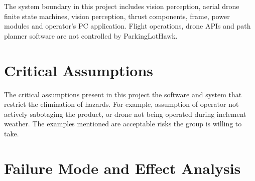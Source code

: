 \documentclass{article}
\begin{document}
The system boundary in this project includes vision perception, aerial drone finite state machines, vision perception, thrust components, frame, power modules and operator’s PC application. Flight operations, drone APIs and path planner software are not controlled by ParkingLotHawk.




\section{Critical Assumptions}
The critical assumptions present in this project the software and system that restrict the elimination of hazards. For example, assumption of operator not actively sabotaging the product, or drone not being operated during inclement weather. The examples mentioned are acceptable risks the group is willing to take. 



\section{Failure Mode and Effect Analysis}
\end{document}

